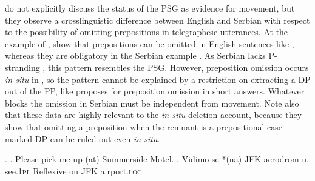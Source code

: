 \citet{barton.progovac2005} do not explicitly discuss the status of the PSG as evidence for movement, but they observe a crosslinguistic difference between English and Serbian with respect to the possibility of omitting prepositions  in telegraphese utterances. At the example of \Next, \citet[88,89]{barton.progovac2005} show that prepositions can be omitted in English sentences like \Next[a], whereas they are obligatory in the Serbian example \Next[b]. As Serbian lacks P-stranding \citep[667--668]{merchant2004}, this pattern resembles the PSG. However, preposition omission occurs \textit{in situ} in \Next, so the pattern cannot be explained by a restriction on extracting a DP out of the PP, like \citet{merchant2004} proposes for preposition omission in short answers. Whatever blocks the omission in Serbian must be independent from movement. Note also that these data are highly relevant to the \textit{in situ} deletion account, because they show that omitting a preposition when the remnant is a prepositional case-marked DP can be ruled out even \textit{in situ}.

\ex. \a. Please pick me up (at) Summerside Motel.
\bg. Vidimo se *(na) JFK aerodrom-u.\\
see.\textsc{1pl} Reflexive \phantom{*(}on JFK airport.\textsc{loc}\\

